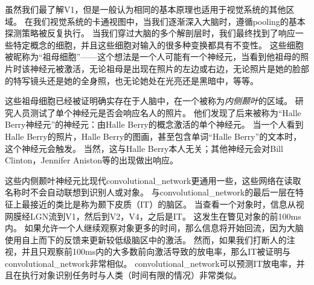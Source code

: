 虽然我们最了解V1，但是一般认为相同的基本原理也适用于视觉系统的其他区域。
在我们视觉系统的卡通视图中，当我们逐渐深入大脑时，遵循\gls{pooling}的基本探测策略被反复执行。
当我们穿过大脑的多个解剖层时，我们最终找到了响应一些特定概念的细胞，并且这些细胞对输入的很多种变换都具有不变性。
这些细胞被昵称为``祖母细胞''——这个想法是一个人可能有一个神经元，当看到他祖母的照片时该神经元被激活，无论祖母是出现在照片的左边或右边，无论照片是她的脸部的特写镜头还是她的全身照，也无论她处在光亮还是黑暗中，等等。

这些祖母细胞已经被证明确实存在于人脑中，在一个被称为\emph{内侧颞叶}的区域\citep{quiroga2005invariant}。
研究人员测试了单个神经元是否会响应名人的照片。
他们发现了后来被称为``Halle Berry神经元''的神经元：由Halle Berry的概念激活的单个神经元。
当一个人看到Halle Berry的照片，Halle Berry的图画，甚至包含单词``Halle Berry''的文本时，这个神经元会触发。
当然，这与Halle Berry本人无关；其他神经元会对Bill Clinton，Jennifer Aniston等的出现做出响应。
 
 
这些内侧颞叶神经元比现代\gls{convolutional_network}更通用一些，这些网络在读取名称时不会自动联想到识别人或对象。
与\gls{convolutional_network}的最后一层在特征上最接近的类比是称为颞下皮质（IT）的脑区。
当查看一个对象时，信息从视网膜经LGN流到V1，然后到V2，V4，之后是IT。
这发生在瞥见对象的前100ms内。
如果允许一个人继续观察对象更多的时间，那么信息将开始回流，因为大脑使用自上而下的反馈来更新较低级脑区中的激活。
然而，如果我们打断人的注视，并且只观察前100ms内的大多数前向激活导致的放电率，那么IT被证明与\gls{convolutional_network}非常相似。
\gls{convolutional_network}可以预测IT放电率，并且在执行对象识别任务时与人类（时间有限的情况）非常类似\citep{dicarlo-tutorial-2013}。

